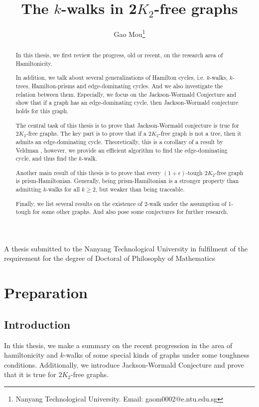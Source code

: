 \documentclass[12pt]{report}
\author{Gao Mou\thanks{Nanyang Technological University. Email: gaom0002@e.ntu.edu.sg}}
\title{The $k$-walks in 2$K_2$-free graphs}
\begin{document}
\begin{titlepage}




\maketitle



A thesis submitted to the Nanyang Technological University in fulfilment of the requirement for the degree of Doctoral of Philosophy of Mathematics
\end{titlepage}

\listoffigures

\tableofcontents

\begin{abstract}
In this thesis, we first review the progress, old or recent, on the research area of Hamiltonicity.

In addition, we talk about several generalizations of Hamilton cycles, i.e. $k$-walks, $k$-trees, Hamilton-prisms and edge-dominating cycles. And we also investigate the relation between them. Especially, we focus on the Jackson-Wormald Conjecture and show that if a graph has an edge-dominating cycle, then Jackson-Wormald conjecture holds for this graph.

The central task of this thesis is to prove that Jackson-Wormald conjecture is true for $2K_2$-free graphs. The key part is to prove that if a $2K_2$-free graph is not a tree, then it admits an edge-dominating cycle. Theoretically, this is a corollary of a result by Veldman \cite{veldman1983existence}, however, we provide an efficient algorithm to find the edge-dominating cycle, and thus find the $k$-walk. 

Another main result of this thesis is to prove that every $(1+\epsilon)$-tough $2K_2$-free graph is prism-Hamiltonian. Generally, being prism-Hamiltonian is a stronger property than admitting $k$-walks for all $k\ge2$, but weaker than being traceable.

Finally, we list several results on the existence of 2-walk under the assumption of 1-tough for some other graphs. And also pose some conjectures for further research.
\end{abstract}

\chapter{Preparation}\label{cpre}
\section{Introduction}
In this thesis, we make a summary on the recent progression in the area of hamiltonicity and $k$-walks of some special kinds of graphs under some toughness conditions. Additionally, we introduce  Jackson-Wormald Conjecture and prove that it is true for $2K_2$-free graphs.
\end{document}
